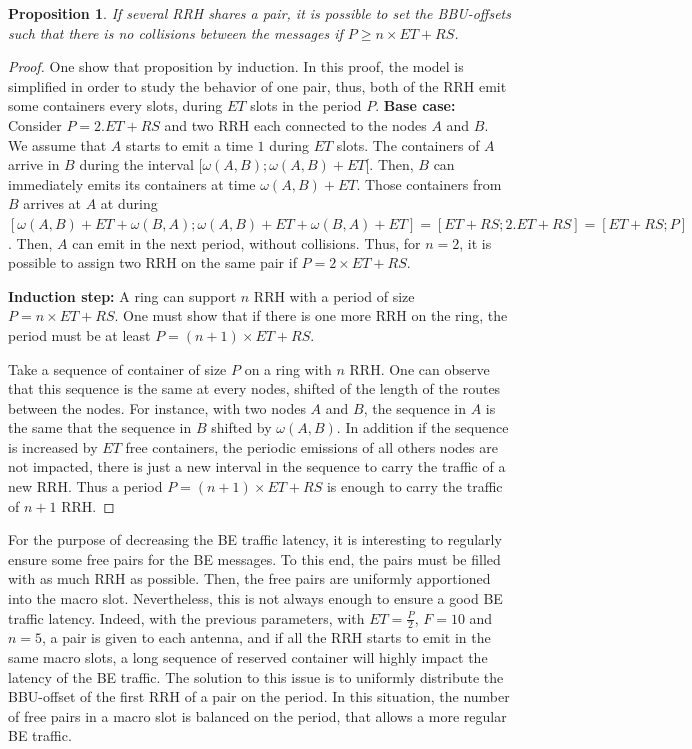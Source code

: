 \documentclass[]{algotel}
\newtheorem{prop}{Proposition}
\begin{document}
\begin{prop}
 If several RRH shares a pair, it is possible to set the BBU-offsets such that there is no collisions between the messages if $P \ge n\times ET + RS$.
 \end{prop}
 \begin{proof}
One show that proposition by induction.
 In this proof, the model is simplified in order to study the behavior of one pair, thus, both of the RRH emit some containers every slots, during $ET$ slots in the period $P$.
 {\bf Base case:} 
 Consider $P =  2.ET+RS$ and two RRH each connected to the nodes $A$ and $B$.
 We assume that $A$ starts to emit a time $1$ during $ET$ slots. The containers of $A$ arrive in $B$ during the interval $[\omega(A,B);\omega(A,B)+ET[$. Then, $B$ can immediately emits its containers at time $\omega(A,B)+ET$. Those containers from $B$ arrives at $A$ at during  $ [\omega(A,B)+ET + \omega(B,A) ;\omega(A,B)+ET + \omega(B,A) + ET ] = [ET+RS;2.ET+RS] = [ET + RS; P]$. Then, $A$ can emit in the next period, without collisions.
Thus, for $n = 2$, it is possible to assign two RRH on the same pair if $P = 2\times ET + RS$.
 
 {\bf Induction step:}  A ring can support $n$ RRH with a period of size $P= n\times ET + RS$. One must show that if there is one more RRH on the ring, the period must be at least $P = (n+1)\times ET + RS$. 
 
Take a sequence of container of size $P$ on a ring with $n$ RRH. One can observe that this sequence is the same at every nodes, shifted of the length of the routes between the nodes. For instance, with two nodes $A$ and $B$, the sequence in $A$ is the same that the sequence in $B$ shifted by $\omega(A,B)$.
In addition if the sequence is increased by $ET$ free containers, the periodic emissions of all others nodes are not impacted, there is just a new interval in the sequence to carry the traffic of a new RRH. Thus a period $P = (n+1)\times ET + RS$ is enough to carry the traffic of $n+1$ RRH.
 \end{proof}

For the purpose of decreasing the BE traffic latency, it is interesting to regularly ensure some free pairs for the BE messages. To this end, the pairs must be filled with as much RRH as possible. Then, the free pairs are uniformly apportioned into the macro slot. Nevertheless, this is not always enough to ensure a good BE traffic latency. Indeed, with the previous parameters, with $ET = \frac{P}{2}$, $F = 10$ and $n = 5$, a pair is given to each antenna, and if all the RRH starts to emit in the same macro slots, a long sequence of reserved container will highly impact the latency of the BE traffic. The solution to this issue is to uniformly distribute the BBU-offset of the first RRH of a pair on the period. In this situation, the number of free pairs in a macro slot is balanced on the period, that allows a more regular BE traffic.
\end{document}
